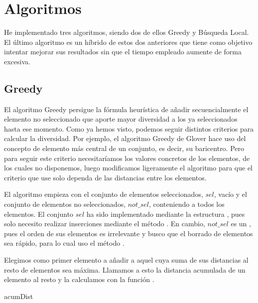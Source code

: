 \documentclass[10pt,a4paper]{article}
\begin{document}
\section{Algoritmos}

He implementado tres algoritmos, siendo dos de ellos Greedy y Búsqueda Local. El último algoritmo es un híbrido de estos dos anteriores que tiene como objetivo intentar mejorar sus resultados sin que el tiempo empleado aumente de forma excesiva.

\subsection{Greedy}

El algoritmo Greedy persigue la fórmula heurística de añadir secuencialmente el elemento no seleccionado que aporte mayor diversidad a los ya seleccionados hasta ese momento. Como ya hemos visto, podemos seguir distintos criterios para calcular la diversidad. Por ejemplo, el algoritmo Greedy de Glover hace uso del concepto de elemento más central de un conjunto, es decir, su baricentro. Pero para seguir este criterio necesitaríamos los valores concretos de los elementos, de los cuales no disponemos, luego modificamos ligeramente el algoritmo para que el criterio que use solo dependa de las distancias entre los elementos.

El algoritmo empieza con el conjunto de elementos seleccionados, $sel$, vacío y el conjunto de elementos no seleccionados, $not\_sel$, conteniendo a todos los elementos. El conjunto $sel$ ha sido implementado mediante la estructura , pues solo necesito realizar inserciones mediante el método . En cambio, $not\_sel$ es un , pues el orden de sus elementos es irrelevante y busco que el borrado de elementos sea rápido, para lo cual uso el método .

Elegimos como primer elemento a añadir a aquel cuya suma de sus distancias al resto de elementos sea máxima. Llamamos a esto la distancia acumulada de un elemento al resto y la calculamos con la función .

\begin{algorithm}
	\caption{acumDist}
\end{algorithm}
\end{document}
